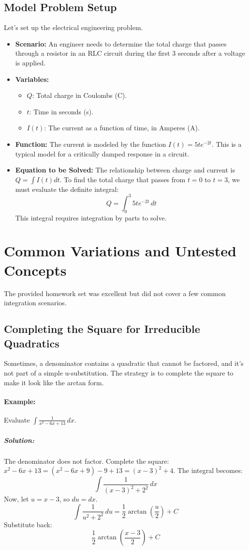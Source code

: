 \documentclass{article}
\begin{document}
\subsection{Model Problem Setup}
Let's set up the electrical engineering problem.
\begin{itemize}
    \item \textbf{Scenario:} An engineer needs to determine the total charge that passes through a resistor in an RLC circuit during the first 3 seconds after a voltage is applied.
    \item \textbf{Variables:}
    \begin{itemize}
        \item $Q$: Total charge in Coulombs (C).
        \item $t$: Time in seconds (s).
        \item $I(t)$: The current as a function of time, in Amperes (A).
    \end{itemize}
    \item \textbf{Function:} The current is modeled by the function $I(t) = 5te^{-2t}$. This is a typical model for a critically damped response in a circuit.
    \item \textbf{Equation to be Solved:} The relationship between charge and current is $Q = \int I(t) dt$. To find the total charge that passes from $t=0$ to $t=3$, we must evaluate the definite integral:
    \[ Q = \int_{0}^{3} 5te^{-2t} \, dt \]
    This integral requires integration by parts to solve.
\end{itemize}

\section{Common Variations and Untested Concepts}
The provided homework set was excellent but did not cover a few common integration scenarios.

\subsection{Completing the Square for Irreducible Quadratics}
Sometimes, a denominator contains a quadratic that cannot be factored, and it's not part of a simple u-substitution. The strategy is to complete the square to make it look like the arctan form.
\paragraph{Example:} Evaluate $\int \frac{1}{x^2 - 6x + 13} \, dx$.
\subparagraph{Solution:} The denominator does not factor. Complete the square:
$x^2 - 6x + 13 = (x^2 - 6x + 9) - 9 + 13 = (x-3)^2 + 4$.
The integral becomes:
\[ \int \frac{1}{(x-3)^2 + 2^2} \, dx \]
Now, let $u = x-3$, so $du = dx$.
\[ \int \frac{1}{u^2 + 2^2} \, du = \frac{1}{2}\arctan\left(\frac{u}{2}\right) + C \]
Substitute back:
\[ \frac{1}{2}\arctan\left(\frac{x-3}{2}\right) + C \]
\end{document}
